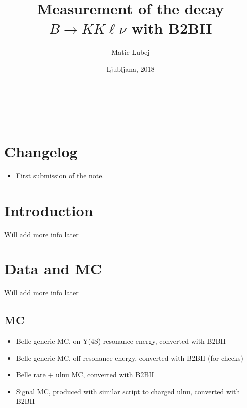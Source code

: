 \documentclass[oneside,a4paper,openany,12pt]{scrbook}
\title{\huge {Measurement of the decay $B \to KK\ell\nu$ with B2BII}}
\author{Matic Lubej}
\date{Ljubljana, 2018}
\begin{document}
\begin{titlingpage} %
\phantom{test}
\vspace{5cm}

\begin{center}
\thetitle
\vspace{0.5 cm} \\
{\Large \theauthor}\\
\vfill
{\Large\thedate}
\end{center}
\end{titlingpage}

\pagestyle{plain}

\chapter*{Changelog}

\begin{itemize}
\item First submission of the note.
\end{itemize}

\tableofcontents
{}


\chapter{Introduction}
Will add more info later

\chapter{Data and MC}

Will add more info later

\section{MC}

\begin{itemize}
\item Belle generic MC, on Y(4S) resonance energy, converted with B2BII
\item Belle generic MC, off resonance energy, converted with B2BII (for checks)
\item Belle rare + ulnu MC, converted with B2BII
\item Signal MC, produced with similar script to charged ulnu, converted with B2BII
\end{itemize}
\end{document}
